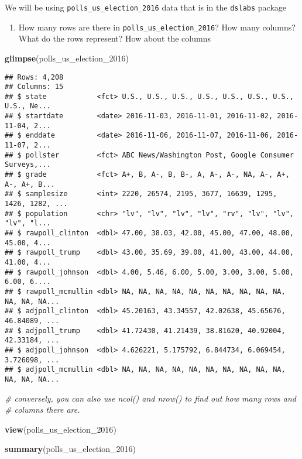 \documentclass[
]{article}
\newenvironment{Shaded}{\begin{snugshade}}{\end{snugshade}}
\newcommand{\CommentTok}[1]{\textcolor[rgb]{0.56,0.35,0.01}{\textit{#1}}}
\newcommand{\DecValTok}[1]{\textcolor[rgb]{0.00,0.00,0.81}{#1}}
\newcommand{\KeywordTok}[1]{\textcolor[rgb]{0.13,0.29,0.53}{\textbf{#1}}}
\newcommand{\NormalTok}[1]{#1}
\providecommand{\tightlist}{%
  \setlength{\itemsep}{0pt}\setlength{\parskip}{0pt}}
\begin{document}
We will be using \texttt{polls\_us\_election\_2016} data that is in the
\texttt{dslabs} package

\begin{enumerate}
\def\labelenumi{\arabic{enumi}.}
\tightlist
\item
  How many rows are there in \texttt{polls\_us\_election\_2016}? How
  many columns? What do the rows represent? How about the columns
\end{enumerate}

\begin{Shaded}
\begin{Highlighting}[]
\KeywordTok{glimpse}\NormalTok{(polls_us_election_}\DecValTok{2016}\NormalTok{)}
\end{Highlighting}
\end{Shaded}

\begin{verbatim}
## Rows: 4,208
## Columns: 15
## $ state            <fct> U.S., U.S., U.S., U.S., U.S., U.S., U.S., U.S., Ne...
## $ startdate        <date> 2016-11-03, 2016-11-01, 2016-11-02, 2016-11-04, 2...
## $ enddate          <date> 2016-11-06, 2016-11-07, 2016-11-06, 2016-11-07, 2...
## $ pollster         <fct> ABC News/Washington Post, Google Consumer Surveys,...
## $ grade            <fct> A+, B, A-, B, B-, A, A-, A-, NA, A-, A+, A-, A+, B...
## $ samplesize       <int> 2220, 26574, 2195, 3677, 16639, 1295, 1426, 1282, ...
## $ population       <chr> "lv", "lv", "lv", "lv", "rv", "lv", "lv", "lv", "l...
## $ rawpoll_clinton  <dbl> 47.00, 38.03, 42.00, 45.00, 47.00, 48.00, 45.00, 4...
## $ rawpoll_trump    <dbl> 43.00, 35.69, 39.00, 41.00, 43.00, 44.00, 41.00, 4...
## $ rawpoll_johnson  <dbl> 4.00, 5.46, 6.00, 5.00, 3.00, 3.00, 5.00, 6.00, 6....
## $ rawpoll_mcmullin <dbl> NA, NA, NA, NA, NA, NA, NA, NA, NA, NA, NA, NA, NA...
## $ adjpoll_clinton  <dbl> 45.20163, 43.34557, 42.02638, 45.65676, 46.84089, ...
## $ adjpoll_trump    <dbl> 41.72430, 41.21439, 38.81620, 40.92004, 42.33184, ...
## $ adjpoll_johnson  <dbl> 4.626221, 5.175792, 6.844734, 6.069454, 3.726098, ...
## $ adjpoll_mcmullin <dbl> NA, NA, NA, NA, NA, NA, NA, NA, NA, NA, NA, NA, NA...
\end{verbatim}

\begin{Shaded}
\begin{Highlighting}[]
\CommentTok{# conversely, you can also use ncol() and nrow() to find out how many rows and }
\CommentTok{# columns there are.}

\KeywordTok{view}\NormalTok{(polls_us_election_}\DecValTok{2016}\NormalTok{)}

\KeywordTok{summary}\NormalTok{(polls_us_election_}\DecValTok{2016}\NormalTok{)}
\end{Highlighting}
\end{Shaded}
\end{document}
